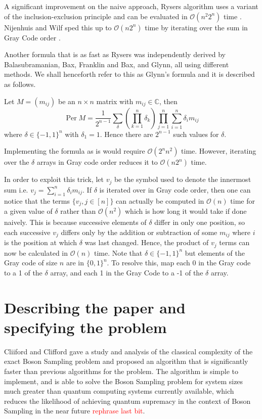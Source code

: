 \documentclass[11pt]{article}
\theoremstyle{theorem}
\theoremstyle{remark}
\theoremstyle{plain}
\theoremstyle{definition}
\DeclareMathOperator*{\Per}{\mathrm{Per}}
\begin{document}
A significant improvement on the naive approach, Rysers algorithm uses a variant of the inclusion-exclusion principle and can be evaluated in $\mathcal{O}(n^2 2^n)$ time  \cite{ryser_1963}. Nijenhuis and Wilf sped this up to $\mathcal{O}(n2^n)$ time by iterating over the sum in Gray Code order \cite{Nijenhuis1978}.

Another formula that is as fast as Rysers was independently derived by Balasubramanian\cite{balasubramanian1980}, Bax\cite{bax1998}, Franklin and Bax\cite{bax1996}, and Glynn\cite{glynn2010}, all using different methods. We shall henceforth refer to this as Glynn's formula and it is described as follows.

Let $M = (m_{ij})$ be an $n \times n$ matrix with $m_{ij} \in \mathbb{C}$, then
\begin{equation}
\Per M = \frac{1}{2^{n-1}} \sum_\delta \left( \prod_{k=1}^n \delta_k \right) \prod_{j=1}^n\sum_{i=1}^n \delta_i m_{ij}
\end{equation}
where $\delta \in \{-1, 1\}^n$ with $\delta_1 = 1$. Hence there are $2^{n-1}$ such values for $\delta$.

Implementing the formula as is would require $\mathcal{O}(2^n n^2)$ time. However, iterating over the $\delta$ arrays in Gray code order reduces it to $\mathcal{O}(n 2^n)$ time.

In order to exploit this trick, let $v_j$ be the symbol used to denote the innermost sum i.e. $v_j = \sum_{i=1}^n \delta_i m_{ij}$. If $\delta$ is iterated over in Gray code order, then one can notice that the terms $\{ v_j, j \in [n]\}$ can actually be computed in $\mathcal{O}(n)$ time for a given value of $\delta$ rather than $\mathcal{O}(n^2)$ which is how long it would take if done naively. This is because successive elements of $\delta$ differ in only one position, so each successive $v_j$ differs only by the addition or subtraction of some $m_{ij}$ where $i$ is the position at which $\delta$ was last changed. Hence, the product of $v_j$ terms can now be calculated in $\mathcal{O}(n)$ time. Note that $\delta \in \{-1, 1\}^n$ but elements of the Gray code of size $n$ are in $\{0, 1\}^n$. To resolve this, map each 0 in the Gray code to a 1 of the $\delta$ array, and each 1 in the Gray Code to a -1 of the $\delta$ array.

\section{Describing the paper and specifying the problem} %
Cliiford and Clifford \cite{clifford17} gave a study and analysis of the classical complexity of the exact Boson Sampling problem and proposed an algorithm that is significantly faster than previous algorithms for the problem. The algorithm is simple to implement, and is able to solve the Boson Sampling problem for system sizes much greater than quantum computing systems currently available, which reduces the likelihood of achieving quantum supremacy in the context of Boson Sampling in the near future \textcolor{red}{rephrase last bit}.
\end{document}
